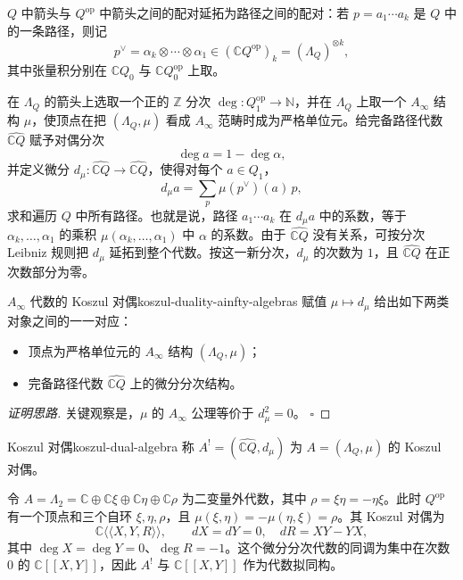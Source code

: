 $Q$ 中箭头与 $Q^{\mathrm{op}}$ 中箭头之间的配对延拓为路径之间的配对：若 $p=a_1\cdots a_k$ 是 $Q$ 中的一条路径，则记
\[
  p^\vee=\alpha_k\otimes\cdots\otimes\alpha_1
  \in(\mathbb C Q^{\mathrm{op}})_k=(\Lambda_Q)^{\otimes k},
\]
其中张量积分别在 $\mathbb C Q_0$ 与 $\mathbb C Q_0^{\mathrm{op}}$ 上取。

在 $\Lambda_Q$ 的箭头上选取一个正的 $\mathbb Z$ 分次 $\deg:Q_1^{\mathrm{op}}\to\mathbb N$，并在 $\Lambda_Q$ 上取一个 $A_\infty$ 结构 $\mu$，使顶点在把 $(\Lambda_Q,\mu)$ 看成 $A_\infty$ 范畴时成为严格单位元。给完备路径代数 $\widehat{\mathbb C Q}$ 赋予对偶分次
\[
  \deg a=1-\deg\alpha,
\]
并定义微分 $d_\mu:\widehat{\mathbb C Q}\to\widehat{\mathbb C Q}$，使得对每个 $a\in Q_1$，
\[
  d_\mu a=\sum_p\mu(p^\vee)(a)\,p,
\]
求和遍历 $Q$ 中所有路径。也就是说，路径 $a_1\cdots a_k$ 在 $d_\mu a$ 中的系数，等于 $\alpha_k,\ldots,\alpha_1$ 的乘积 $\mu(\alpha_k,\ldots,\alpha_1)$ 中 $\alpha$ 的系数。由于 $\widehat{\mathbb C Q}$ 没有关系，可按分次 Leibniz 规则把 $d_\mu$ 延拓到整个代数。按这一新分次，$d_\mu$ 的次数为 $1$，且 $\widehat{\mathbb C Q}$ 在正次数部分为零。

\begin{theorem}{$A_\infty$ 代数的 Koszul 对偶}{koszul-duality-ainfty-algebras}
赋值 $\mu\mapsto d_\mu$ 给出如下两类对象之间的一一对应：
\begin{itemize}
  \item 顶点为严格单位元的 $A_\infty$ 结构 $(\Lambda_Q,\mu)$；
  \item 完备路径代数 $\widehat{\mathbb C Q}$ 上的微分分次结构。
\end{itemize}
\end{theorem}
\begin{proof}[证明思路]
关键观察是，$\mu$ 的 $A_\infty$ 公理等价于 $d_\mu^2=0$。
\hfill$\square$
\end{proof}

\begin{definition}{Koszul 对偶}{koszul-dual-algebra}
称 $A^!=(\widehat{\mathbb C Q},d_\mu)$ 为 $A=(\Lambda_Q,\mu)$ 的 Koszul 对偶。
\end{definition}

\begin{example}
令 $A=\Lambda_2=\mathbb C\oplus\mathbb C\xi\oplus\mathbb C\eta\oplus\mathbb C\rho$ 为二变量外代数，其中 $\rho=\xi\eta=-\eta\xi$。此时 $Q^{\mathrm{op}}$ 有一个顶点和三个自环 $\xi,\eta,\rho$，且 $\mu(\xi,\eta)=-\mu(\eta,\xi)=\rho$。其 Koszul 对偶为
\[
  \mathbb C\langle\!\langle X,Y,R\rangle\!\rangle,
  \qquad dX=dY=0,\quad dR=XY-YX,
\]
其中 $\deg X=\deg Y=0$、$\deg R=-1$。这个微分分次代数的同调为集中在次数 $0$ 的 $\mathbb C[[X,Y]]$，因此 $A^!$ 与 $\mathbb C[[X,Y]]$ 作为代数拟同构。
\end{example}

